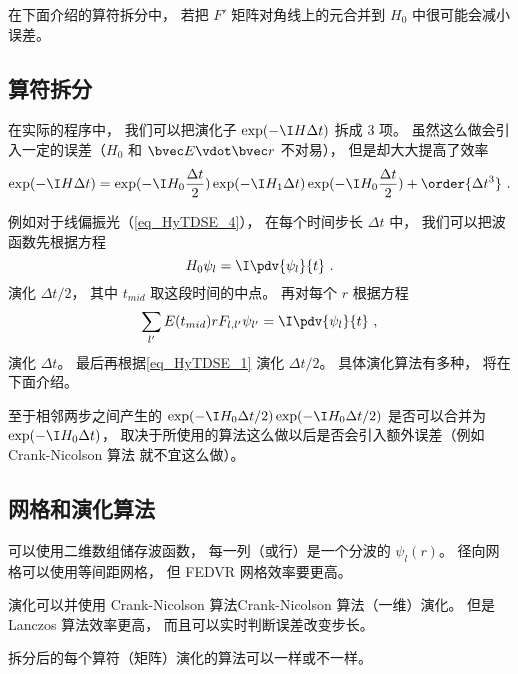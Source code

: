 在下面介绍的算符拆分中， 若把 $F'$ 矩阵对角线上的元合并到 $H_0$ 中很可能会减小误差。

\subsection{算符拆分}
在实际的程序中， 我们可以把演化子 $\exp(-\I H \Delta t)$ 拆成 3 项。 虽然这么做会引入一定的误差（$H_0$ 和 $\bvec E\vdot\bvec r$ 不对易）， 但是却大大提高了效率
\begin{equation}\label{eq_HyTDSE_2}
\exp(-\I H \Delta t) = \exp(-\I H_0 \frac{\Delta t}{2}) \exp(-\I H_1 \Delta t)\exp(-\I H_0 \frac{\Delta t}{2}) + \order{\Delta t^3}~.
\end{equation}

例如对于线偏振光（\autoref{eq_HyTDSE_4}）， 在每个时间步长 $\Delta t$ 中， 我们可以把波函数先根据方程
\begin{equation}\label{eq_HyTDSE_1}
H_0 \psi_{l} = \I \pdv{\psi_{l}}{t}~.
\end{equation}
演化 $\Delta t/2$， 其中 $t_{mid}$ 取这段时间的中点。 再对每个 $r$ 根据方程
\begin{equation}\label{eq_HyTDSE_9}
\sum_{l'} E(t_{mid})rF_{l, l'} \psi_{l'} = \I \pdv{\psi_{l}}{t}~,
\end{equation}
演化 $\Delta t$。 最后再根据\autoref{eq_HyTDSE_1} 演化 $\Delta t/2$。 具体演化算法有多种， 将在下面介绍。

至于相邻两步之间产生的 $\exp(-\I H_0 {\Delta t}/{2})\exp(-\I H_0 {\Delta t}/{2})$ 是否可以合并为 $\exp(-\I H_0 {\Delta t})$， 取决于所使用的算法这么做以后是否会引入额外误差（例如 Crank-Nicolson 算法 就不宜这么做）。

\subsection{网格和演化算法}

可以使用二维数组储存波函数， 每一列（或行）是一个分波的 $\psi_l(r)$。 径向网格可以使用等间距网格， 但 FEDVR 网格效率要更高。

演化可以并使用 Crank-Nicolson 算法Crank-Nicolson 算法（一维）演化。 但是 Lanczos 算法效率更高， 而且可以实时判断误差改变步长。

拆分后的每个算符（矩阵）演化的算法可以一样或不一样。

